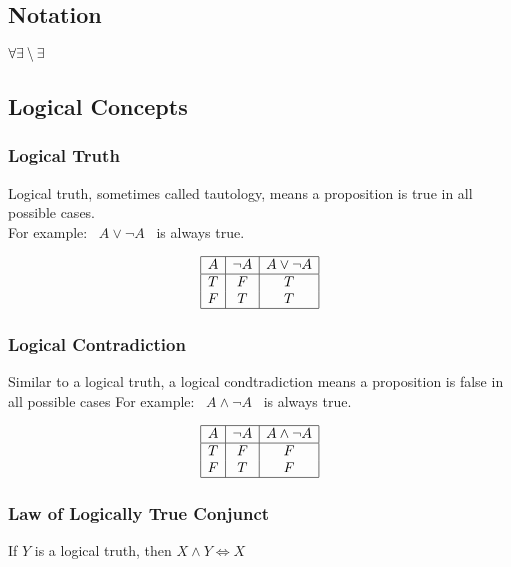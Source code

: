\documentclass[a4paper]{article}
\begin{document}
\subsection{Notation}
$\forall
\\
\exists
\setminus
\exists \!
$
\subsection{Logical Concepts}
\subsubsection{Logical Truth}
Logical truth, sometimes called tautology, means a proposition is true in all possible cases. \\
For example: \ $A \lor \lnot A$ \ is always true. 
\begin{center}
	\begin{displaymath}
		\begin{array}{|c|c|c|}
			\hline
			A & \lnot A & A \lor \lnot A \\ 
			\hline
			T & F & T\\
			F & T & T\\
			\hline
		\end{array}
	\end{displaymath}
\end{center}

\subsubsection{Logical Contradiction}
Similar to a logical truth, a logical condtradiction means a proposition is false in all possible cases
For example: \ $A \land \lnot A$ \ is always true. 
\begin{center}
	\begin{displaymath}
		\begin{array}{|c|c|c|}
			\hline
			A & \lnot A & A \land \lnot A \\ 
			\hline
			T & F & F\\
			F & T & F\\
			\hline
		\end{array}
	\end{displaymath}
\end{center}

\subsubsection{Law of Logically True Conjunct}
If $Y$ is a logical truth, then $X \land Y \Leftrightarrow X$
\end{document}
